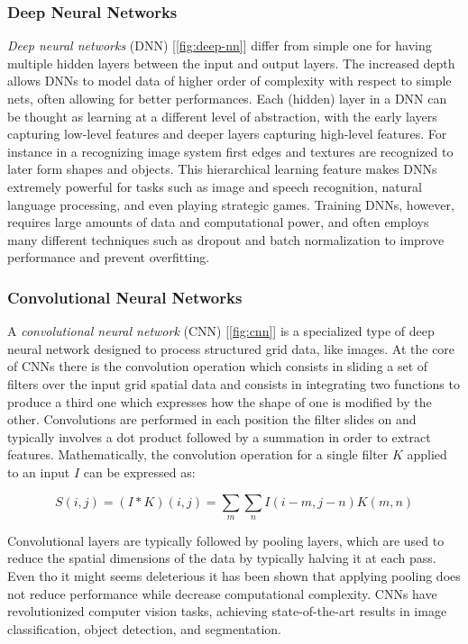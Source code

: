 \documentclass[../Thesis.tex]{subfiles}
\begin{document}
	\subsubsection{Deep Neural Networks}
	\emph{Deep neural networks} (DNN) [\autoref{fig:deep-nn}] differ from simple one for having multiple hidden layers between the input and output layers. The increased depth allows DNNs to model data of higher order of complexity with respect to simple nets, often allowing for better performances. Each (hidden) layer in a DNN can be thought as learning at a different level of abstraction, with the early layers capturing low-level features and deeper layers capturing high-level features. For instance in a recognizing image system first edges and textures are recognized to later form shapes and objects. This hierarchical learning feature makes DNNs extremely powerful for tasks such as image and speech recognition, natural language processing, and even playing strategic games. Training DNNs, however, requires large amounts of data and computational power, and often employs many different techniques such as dropout and batch normalization to improve performance and prevent overfitting.
	
	
	
	\subsubsection{Convolutional Neural Networks}
	A \emph{convolutional neural network} (CNN) [\autoref{fig:cnn}] is a specialized type of deep neural network designed to process structured grid data, like images. At the core of CNNs there is the convolution operation which consists in sliding a set of filters over the input grid spatial data and consists in integrating two functions to produce a third one which expresses how the shape of one is modified by the other. Convolutions are performed in each position the filter slides on and typically involves a dot product followed by a summation in order to extract features. Mathematically, the convolution operation for a single filter \(K\) applied to an input \(I\) can be expressed as:
	
	\[
	S(i, j) = (I * K)(i, j) = \sum_{m} \sum_{n} I(i - m, j - n) K(m, n)
	\]
	
	Convolutional layers are typically followed by pooling layers, which are used to reduce the spatial dimensions of the data by typically halving it at each pass. Even tho it might seems deleterious it has been shown that applying pooling does not reduce performance while decrease computational complexity. CNNs have revolutionized computer vision tasks, achieving state-of-the-art results in image classification, object detection, and segmentation.
	
\end{document}
